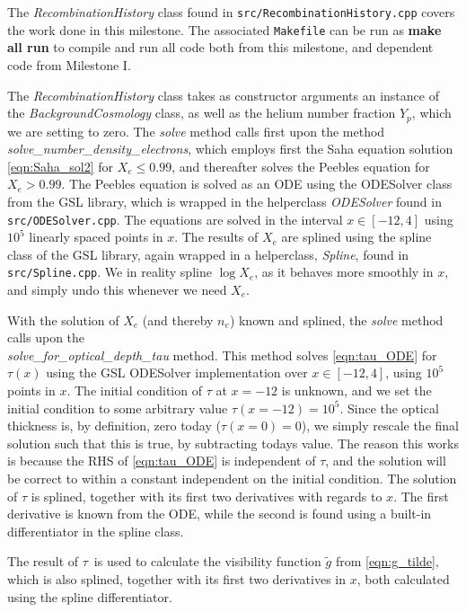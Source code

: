 \documentclass[10pt, a4paper]{article}
\begin{document}
The \textit{RecombinationHistory} class found in \texttt{src/RecombinationHistory.cpp} covers the work done in this milestone. The associated \texttt{Makefile} can be run as \textbf{make all run} to compile and run all code both from this milestone, and dependent code from Milestone I.

The \textit{RecombinationHistory} class takes as constructor arguments an instance of the \textit{BackgroundCosmology} class, as well as the helium number fraction $Y_p$, which we are setting to zero. The \textit{solve} method calls first upon the method \textit{solve\_number\_density\_electrons}, which employs first the Saha equation solution \ref{eqn:Saha_sol2} for $X_e \leq 0.99$, and thereafter solves the Peebles equation for $X_e > 0.99$. The Peebles equation is solved as an ODE using the ODESolver class from the GSL library, which is wrapped in the helperclass \textit{ODESolver} found in \texttt{src/ODESolver.cpp}. The equations are solved in the interval $x\in [-12, 4]$ using $10^5$ linearly spaced points in $x$. The results of $X_e$ are splined using the spline class of the GSL library, again wrapped in a helperclass, \textit{Spline}, found in \texttt{src/Spline.cpp}. We in reality spline $\log{X_e}$, as it behaves more smoothly in $x$, and simply undo this whenever we need $X_e$.

With the solution of $X_e$ (and thereby $n_e$) known and splined, the \textit{solve} method calls upon the\\
\textit{solve\_for\_optical\_depth\_tau} method. This method solves \ref{eqn:tau_ODE} for $\tau(x)$ using the GSL ODESolver implementation over $x\in[-12, 4]$, using $10^5$ points in $x$. The initial condition of $\tau$ at $x=-12$ is unknown, and we set the initial condition to some arbitrary value $\tau(x=-12) = 10^5$. Since the optical thickness is, by definition, zero today ($\tau(x=0) = 0$), we simply rescale the final solution such that this is true, by subtracting todays value. The reason this works is because the RHS of \ref{eqn:tau_ODE} is independent of $\tau$, and the solution will be correct to within a constant independent on the initial condition. The solution of $\tau$ is splined, together with its first two derivatives with regards to $x$. The first derivative is known from the ODE, while the second is found using a built-in differentiator in the spline class.

The result of $\tau$ is used to calculate the visibility function $\tilde{g}$ from \ref{eqn:g_tilde}, which is also splined, together with its first two derivatives in $x$, both calculated using the spline differentiator.
\end{document}
